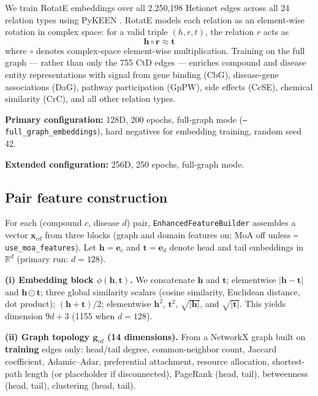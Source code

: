 \documentclass[twocolumn,10pt]{article}
\begin{document}
We train RotatE \cite{rotate2019} embeddings over all 2,250,198 Hetionet edges across all 24 relation types using PyKEEN \cite{pykeen2021}. RotatE models each relation as an element-wise rotation in complex space: for a valid triple $(h, r, t)$, the relation $r$ acts as
\begin{equation}
\mathbf{h} \circ \mathbf{r} \approx \mathbf{t}
\end{equation}
where $\circ$ denotes complex-space element-wise multiplication. Training on the full graph --- rather than only the 755 CtD edges --- enriches compound and disease entity representations with signal from gene binding (CbG), disease-gene associations (DaG), pathway participation (GpPW), side effects (CcSE), chemical similarity (CrC), and all other relation types.

\textbf{Primary configuration:} 128D, 200 epochs, full-graph mode (\texttt{--full\_graph\_embeddings}), hard negatives for embedding training, random seed 42.

\textbf{Extended configuration:} 256D, 250 epochs, full-graph mode.

\subsection{Pair feature construction}

For each (compound $c$, disease $d$) pair, \texttt{EnhancedFeatureBuilder} assembles a vector $\mathbf{x}_{cd}$ from three blocks (graph and domain features on; MoA off unless \texttt{--use\_moa\_features}). Let $\mathbf{h}=\mathbf{e}_c$ and $\mathbf{t}=\mathbf{e}_d$ denote head and tail embeddings in $\mathbb{R}^{d}$ (primary run: $d=128$).

\textbf{(i) Embedding block $\phi(\mathbf{h},\mathbf{t})$.} We concatenate $\mathbf{h}$ and $\mathbf{t}$; elementwise $|\mathbf{h}-\mathbf{t}|$ and $\mathbf{h}\odot\mathbf{t}$; three global similarity scalars (cosine similarity, Euclidean distance, dot product); $(\mathbf{h}+\mathbf{t})/2$; elementwise $\mathbf{h}^{2}$, $\mathbf{t}^{2}$, $\sqrt{|\mathbf{h}|}$, and $\sqrt{|\mathbf{t}|}$. This yields dimension $9d+3$ (1155 when $d=128$).

\textbf{(ii) Graph topology $\mathbf{g}_{cd}$ (14 dimensions).} From a NetworkX graph built on \textbf{training} edges only: head/tail degree, common-neighbor count, Jaccard coefficient, Adamic--Adar, preferential attachment, resource allocation, shortest-path length (or placeholder if disconnected), PageRank (head, tail), betweenness (head, tail), clustering (head, tail).
\end{document}
